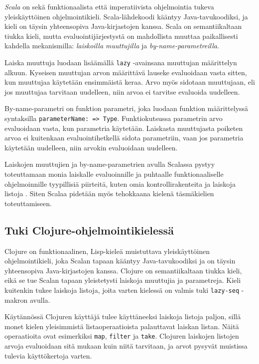 \textit{Scala} on sekä funktionaalista että imperatiivista ohjelmointia tukeva yleiskäyttöinen ohjelmointikieli. Scala-lähdekoodi kääntyy Java-tavukoodiksi, ja kieli on täysin yhteensopiva Java-kirjastojen kanssa. Scala on semantiikaltaan tiukka kieli, mutta evaluointijärjestystä on mahdollista muuttaa paikallisesti kahdella mekanismilla: \textit{laiskoilla muuttujilla} ja \textit{by-name-parametreilla}.

Laiska muuttuja luodaan lisäämällä \verb!lazy! -avainsana muuttujan määrittelyn alkuun. Kyseisen muuttujan arvon määrittävä lauseke evaluoidaan vasta sitten, kun muuttujaa käytetään ensimmäistä keraa. Arvo myös sidotaan muuttujaan, eli jos muuttujaa tarvitaan uudelleen, niin arvoa ei tarvitse evaluoida uudelleen.

By-name-parametri on funktion parametri, joka luodaan funktion määrittelyssä syntaksilla \verb!parameterName: => Type!. Funktiokutsussa parametrin arvo evaluoidaan vasta, kun parametria käytetään. Laiskasta muuttujasta poiketen arvoa ei kuitenkaan evaluointihetkellä sidota parametriin, vaan jos parametria käytetään uudelleen, niin arvokin evaluoidaan uudelleen.

Laiskojen muuttujien ja by-name-parametrien avulla Scalassa pystyy toteuttamaan monia laiskalle evaluoinnille ja puhtaalle funktionaaliselle ohjelmoinnille tyypillisiä piirteitä, kuten omia kontrollirakenteita ja laiskoja listoja \citet{chiusano2014functional}. Siten Scalaa pidetään myös tehokkaana kielenä täsmäkielien toteuttamiseen.

\subsection{Tuki Clojure-ohjelmointikielessä}

Clojure on funktionaalinen, Lisp-kieleä muistuttava yleiskäyttöinen ohjelmointikieli, joka Scalan tapaan kääntyy Java-tavukoodiksi ja on täysin yhteensopiva Java-kirjastojen kanssa. Clojure on semantiikaltaan tiukka kieli, eikä se tue Scalan tapaan yleistetysti laiskoja muuttujia ja parametreja. Kieli kuitenkin tukee laiskoja listoja, joita varten kielessä on valmis tuki \verb!lazy-seq! -makron avulla.

Käytännössä Clojuren käyttäjä tulee käyttäneeksi laiskoja listoja paljon, sillä monet kielen yleisimmistä listaoperaatioista palauttavat laiskan listan. Näitä operaatioita ovat esimerkiksi \verb!map!, \verb!filter! ja \verb!take!. Clojuren laiskojen listojen arvoja evaluoidaan sitä mukaan kuin niitä tarvitaan, ja arvot pysyvät muistissa tulevia käyttökertoja varten.

